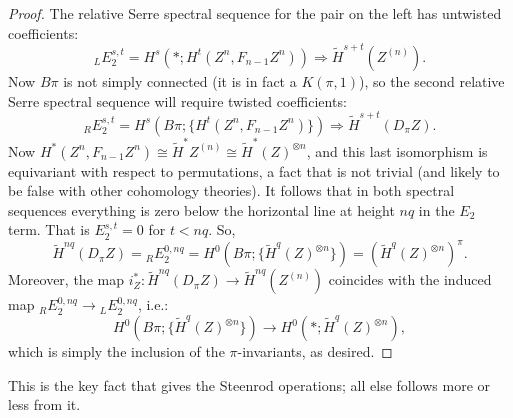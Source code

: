 \documentclass{article}
\begin{document}
\begin{proof}
The relative Serre spectral sequence for the pair on the left has untwisted coefficients:
\[
_LE_2^{s,t} = H^s(*; H^t(Z^n, F_{n-1} Z^n)) \Rightarrow \widetilde H^{s+t}(Z^{(n)})
.\]
Now $B \pi$ is not simply connected (it is in fact a $K(\pi,1)$), so the second relative Serre spectral sequence will require twisted coefficients:
\[
_RE_2^{s,t} = H^s(B\pi; \{H^t(Z^n, F_{n-1} Z^n)\}) \Rightarrow \widetilde H^{s+t}(D_\pi Z)
.\]
Now $H^*(Z^n, F_{n-1} Z^n) \cong \widetilde H^* Z^{(n)} \cong \widetilde H^*(Z)^{\otimes n}$, and this last isomorphism is equivariant with respect to permutations, a fact that is not trivial (and likely to be false with other cohomology theories).  It follows that in both spectral sequences everything is zero below the horizontal line at height $nq$ in the $E_2$ term. That is $E_2^{s,t}=0$ for $t<nq$.  So, %
\[
\widetilde H^{nq}(D_\pi Z) ={_RE_2^{0,nq}}= H^0(B\pi; \{\widetilde H^q(Z)^{\otimes n}\}) = (\widetilde H^q(Z)^{\otimes n})^\pi.\]
Moreover, the map $i^*_Z:\widetilde H^{nq}(D_\pi Z)\to \widetilde H^{nq}(Z^{(n)})$ coincides with the induced map $_RE_2^{0,nq}\to{_LE_2^{0,nq}}$, i.e.: %
\[H^0(B\pi; \{\widetilde H^q(Z)^{\otimes n}\})\to H^0(*;\widetilde H^q(Z)^{\otimes n}),\]
which is simply the inclusion of the $\pi$-invariants, as desired.
\end{proof}
\noindent This is the key fact that gives the Steenrod operations; all else follows more or less from it.
\end{document}
